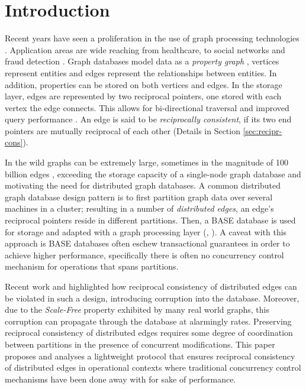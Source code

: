 \documentclass[sigplan,10pt]{acmart}
\begin{document}


\maketitle

\section{Introduction}
\label{sec:introduction}

Recent years have seen a proliferation in the use of graph processing technologies \cite{Besta2019}. Application areas are wide reaching from healthcare, to social networks and fraud detection \cite{Eifrem2016}. Graph databases model data as a \textit{property graph} \cite{Robinson2015}, vertices represent entities and edges represent the relationships between entities. In addition, properties can be stored on both vertices and edges. In the storage layer, edges are represented by two reciprocal pointers, one stored with each vertex the edge connects. This allows for bi-directional traversal and improved query performance \cite{Robinson2015}. An edge is said to be \emph{reciprocally consistent}, if its two end pointers are mutually reciprocal of each other (Details in Section \ref{sec:recipr-cons}).

In the wild graphs can be extremely large, sometimes in the magnitude of 100 billion edges \cite{Sahu2017}, exceeding the storage capacity of a single-node graph database and motivating the need for distributed graph databases. A common distributed graph database design pattern is to first partition graph data over several machines in a cluster; resulting in a number of \emph{distributed edges}, an edge's reciprocal pointers reside in different partitions. Then, a BASE database \cite{Pritchett2008} is used for storage and adapted with a graph processing layer (\cite{janusgraph}, \cite{TitanDB}). A caveat with this approach is BASE databases often eschew transactional guarantees in order to achieve higher performance, specifically there is often no concurrency control mechanism for operations that spans partitions.

Recent work \cite{Ezhilchelvan2018} and \cite{Webber2019} highlighted how reciprocal consistency of distributed edges can be violated in such a design, introducing corruption into the database. Moreover, due to the \emph{Scale-Free} \cite{ScaleFree} property exhibited by many real world graphs, this corruption can propagate through the database at alarmingly rates. Preserving reciprocal consistency of distributed edges requires some degree of coordination between partitions in the presence of concurrent modifications. This paper proposes and analyses a lightweight protocol that ensures reciprocal consistency of distributed edges in operational contexts where traditional concurrency control mechanisms have been done away with for sake of performance.
\end{document}
